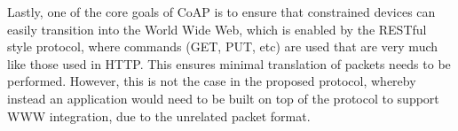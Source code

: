 Lastly, one of the core goals of CoAP is to ensure that constrained devices can easily transition into the World Wide Web, which is enabled by the RESTful style protocol, where commands (GET, PUT, etc) are used that are very much like those used in HTTP. This ensures minimal translation of packets needs to be performed. However, this is not the case in the proposed protocol, whereby instead an application would need to be built on top of the protocol to support WWW integration, due to the unrelated packet format.


